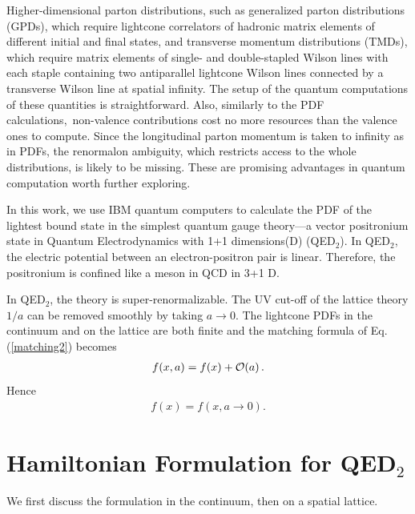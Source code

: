 \documentclass[aps,prd,twocolumn,tightenlines,superscriptaddress,
nofootinbib,preprintnumbers]{revtex4-1}
\begin{document}
Higher-dimensional parton distributions, such as generalized parton distributions (GPDs), which require lightcone correlators of hadronic matrix elements of different initial and final states, and transverse momentum distributions (TMDs), which require matrix elements of single- and double-stapled Wilson lines with each staple containing two antiparallel lightcone Wilson lines connected by a transverse Wilson line at spatial infinity. The setup of the quantum computations of these quantities is straightforward. Also, similarly to the PDF calculations, non-valence contributions cost no more resources than the valence ones to compute. Since the longitudinal parton momentum is taken to infinity as in PDFs, the renormalon ambiguity, which restricts access to the whole distributions, is likely to be missing. These are promising advantages in quantum computation worth further exploring.

In this work, we use IBM quantum computers to calculate the PDF of the lightest bound state in the simplest quantum gauge theory---a vector positronium state in Quantum Electrodynamics with 1+1 dimensions(D) (QED$_2$). In QED$_2$, the electric potential between an electron-positron pair is linear. Therefore, the positronium is confined like a meson in QCD in 3+1 D. 

In QED$_2$, the theory is super-renormalizable. The UV cut-off of the lattice theory $1/a$ can be removed smoothly by taking $a \to 0$. The lightcone PDFs in the continuum and on the lattice are both finite and  
the matching formula of Eq.(\ref{matching2}) becomes
\begin{eqnarray}\label{eq:3}
    f(x,a) =    f(x) 
    + {\cal O}(a)\, .
\end{eqnarray}
Hence 
\begin{eqnarray}
f(x)=f(x,a\to 0) .
\end{eqnarray}


\section{Hamiltonian Formulation for QED$_2$}


We first discuss the formulation in the continuum, then on a spatial lattice.
\end{document}
